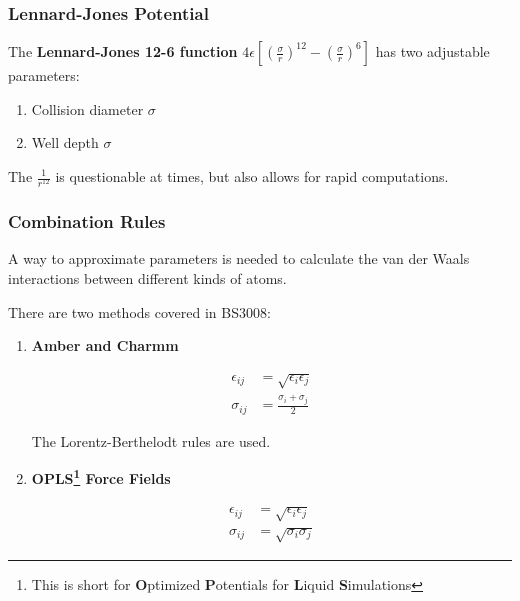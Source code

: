 \documentclass[
  letterpaper,
  DIV=11,
  numbers=noendperiod]{scrreprt}
\providecommand{\tightlist}{%
  \setlength{\itemsep}{0pt}\setlength{\parskip}{0pt}}\usepackage{longtable,booktabs,array}
\begin{document}
\hypertarget{lennard-jones-potential}{%
\subsubsection{Lennard-Jones Potential}\label{lennard-jones-potential}}

The \textbf{Lennard-Jones 12-6 function}
\(\displaystyle 4\epsilon\left[\left(\frac{\sigma}{r}\right)^{12} - \left(\frac{\sigma}{r}\right)^6\right]\)
has two adjustable parameters:

\begin{enumerate}
\def\labelenumi{\arabic{enumi}.}
\tightlist
\item
  Collision diameter \(\sigma\)
\item
  Well depth \(\sigma\)
\end{enumerate}

The \(\displaystyle \frac{1}{r^{12}}\) is questionable at times, but
also allows for rapid computations.

\hypertarget{combination-rules}{%
\subsubsection{Combination Rules}\label{combination-rules}}

A way to approximate parameters is needed to calculate the van der Waals
interactions between different kinds of atoms.

There are two methods covered in BS3008:

\begin{enumerate}
\def\labelenumi{\arabic{enumi}.}
\item
  \textbf{Amber and Charmm}

  \begin{align}
    \epsilon_{ij} &= \sqrt{\epsilon_i\epsilon_j} \\ 
    \sigma_{ij} &= \frac{\sigma_i + \sigma_j}{2}
  \end{align}

  The Lorentz-Berthelodt rules are used.
\item
  \textbf{OPLS\footnote{This is short for \textbf{O}ptimized
    \textbf{P}otentials for \textbf{L}iquid \textbf{S}imulations} Force
  Fields}

  \begin{align}
    \epsilon_{ij} &= \sqrt{\epsilon_i\epsilon_j} \\ 
    \sigma_{ij} &= \sqrt{\sigma_i\sigma_j}
  \end{align}
\end{enumerate}
\end{document}
